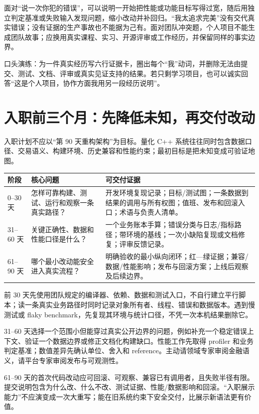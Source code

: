 面对“说一次你犯的错误”，可以说明一开始把性能或功能目标写得过宽，随后用独立判定基准或失败输入发现问题，缩小改动并补回归。“我太追求完美”没有交代真实错误；没有证据的生产事故也不能据为己有。面对团队冲突题，个人项目不能生成团队故事；应换用真实课程、实习、开源评审或工作经历，并保留同样的事实边界。

口头演练：为一件真实经历写六行证据卡，圈出每个“我”动词，并删除无法由提交、测试、文档、评审或真实见证支持的结果。若只剩学习项目，也可以诚实回答“这是个人项目，协作方面我用另一段经历说明”。

\section{入职前三个月：先降低未知，再交付改动}

入职计划不应以“第 90 天重构架构”为目标。量化 C++ 系统往往同时包含数据口径、交易语义、构建环境、历史兼容和性能约束；最初目标是把未知变成可验证地图。

\begin{center}
\begin{tabularx}{\textwidth}{@{}p{}p{}X@{}}
\toprule
阶段 & 核心问题 & 可交付证据 \\
\midrule
0--30 天 & 怎样可靠构建、测试、运行和观察一条真实路径？ & 开发环境复现记录；目标/测试图；一条数据到结果的调用与所有权图；值班、发布和回滚入口；术语与负责人清单。 \\
31--60 天 & 关键正确性、数据和性能口径是什么？ & 一个业务账本手算；错误分类与日志/指标路径；带环境的基线；一次小缺陷复现或文档修复；评审反馈记录。 \\
61--90 天 & 哪个最小改动能安全进入真实流程？ & 明确验收的最小纵向闭环；红—绿证据；兼容/数据/性能影响；发布与回滚方案；上线后观察及后续边界。 \\
\bottomrule
\end{tabularx}
\end{center}

前 30 天先使用团队规定的编译器、依赖、数据和测试入口，不自行建立平行脚本；读一条真实业务路径时同时记录对象所有者、线程、错误和数据版本。遇到慢测试或 flaky benchmark，先复现其环境与统计口径，不凭一次本机结果删除它。

31--60 天选择一个范围小但能穿过真实公开边界的问题，例如补充一个稳定错误上下文、验证一个数据边界或修正文档化构建缺口。性能工作先取得 profiler 和业务判定基准；数值差异先确认单位、舍入和 reference。主动请领域专家审阅金融语义，请平台专家审阅发布与可观测性。

61--90 天的首次代码改动应可回滚、可观察、兼容已有调用者，且失败半径有限。提交说明包含为什么改、什么不改、测试证据、性能/数据影响和回滚。“入职展示能力”不应演变成一次大重写；能在旧系统约束下安全交付，比展示新语法更有价值。

